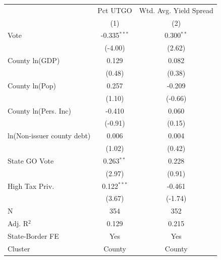 \begingroup
\centering
\begin{tabular*}{\textwidth}{@{\extracolsep{\fill}}lcc}
   \toprule
                              & Pct UTGO       & Wtd. Avg. Yield Spread\\  
                              & (1)            & (2)\\  
   \midrule 
   Vote                       & -0.335$^{***}$ & 0.300$^{**}$\\   
                              & (-4.00)        & (2.62)\\   
   County ln(GDP)             & 0.129          & 0.082\\   
                              & (0.48)        & (0.38)\\   
   County ln(Pop)             & 0.257          & -0.209\\   
                              & (1.10)         & (-0.66)\\   
   County ln(Pers. Inc)       & -0.410         & 0.060\\   
                              & (-0.91)       & (0.15)\\   
   ln(Non-issuer county debt) & 0.006          & 0.004\\   
                              & (1.02)         & (0.42)\\   
   State GO Vote              & 0.263$^{**}$   & 0.228\\   
                              & (2.97)         & (0.91)\\   
   High Tax Priv.             & 0.122$^{***}$  & -0.461\\   
                              & (3.67)         & (-1.74)\\   
   \hline
   N               & 354            & 352\\  
   Adj. R$^2$             & 0.129          & 0.215\\  
   State-Border FE            & Yes            & Yes\\  
   Cluster              & County & County\\  
   \bottomrule
\end{tabular*}
\par\endgroup
